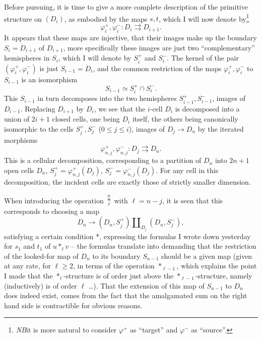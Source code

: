 %
\label{sec:7}%
Before pursuing, it is time to give a more complete description of the
primitive structure on $(D_i)$, as embodied by the maps $s,t$, which I
will now denote by\footnote{\emph{NB}\enspace it is more natural to consider
  $\varphi^+$ as ``target'' and $\varphi^-$ as ``source''.}
\[\varphi_i^+,\varphi_i^- :  D_i \rightrightarrows D_{i+1}. \]
It appears that these maps are injective, that their images make
up the boundary $S_i = \dot D_{i+1}$ of $D_{i+1}$, more
specifically these images are just two ``complementary'' hemispheres
in $S_i$, which I will denote by $S_i^+$ and $S_i^-$. The kernel of
the pair $(\varphi_i^+, \varphi_i^-)$ is just $S_{i-1} = \dot D_i$,
and the common restriction of the maps $\varphi_i^+, \varphi_i^-$ to
$S_{i-1}$ is an isomorphism
\[ S_{i-1} \simeq  S_i^+ \cap S_i^-.\]
This $S_{i-1}$ in turn decomposes into the two hemispheres $S_{i-1}^+,
S_{i-1}^-$, images of $D_{i-1}$. Replacing $D_{i+1}$ by $D_i$, we see
that the $i$-cell $D_i$ is decomposed into a union of $2i+1$ closed
cells, one being $D_i$ itself, the others being canonically isomorphic
to the cells $S_j^+,S_j^-$ ($0\le j\le i$), images of $D_j\to D_n$ by
the iterated morphisms
\[\varphi_{n,j}^+,\varphi_{n,j}^- :  D_j \rightrightarrows D_n. \]
This is a cellular decomposition, corresponding to a partition of
$D_n$ into $2n+1$ open cells $D_n$, $S_j^+ = \varphi_{n,j}^+(D_j)$,
$S_j^- = \varphi_{n,j}^-(D_j)$. For any cell in this decomposition,
the incident cells are exactly those of strictly smaller dimension.

When introducing the operation $\overset{n}{\underset{\ell}{*}}$ with
$\ell=n-j$, it is seen that this corresponds to choosing a map
\[ D_n \to (D_n, S_j^+) \amalg_{D_j} (D_n, S_j^-),\]
satisfying a certain condition *, expressing the formulas I wrote down
yesterday for $s_1$ and $t_1$ of $u *_\ell v$ -- the formulas
translate into demanding that the restriction of the looked-for map of
$D_n$ to its boundary $S_{n-1}$ should be a given map (given at any
rate, for $\ell\ge2$, in terms of the operation $*_{\ell-1}$, which
explains the point I made that the $*_\ell$-structure is of order just
above the $*_{\ell-1}$-structure, namely (inductively) is of order
$\ell$ \ldots). That the extension of this map of $S_{n-1}$ to $D_n$
does indeed exist, comes from the fact that the amalgamated sum on the
right hand side is contractible for obvious reasons.

